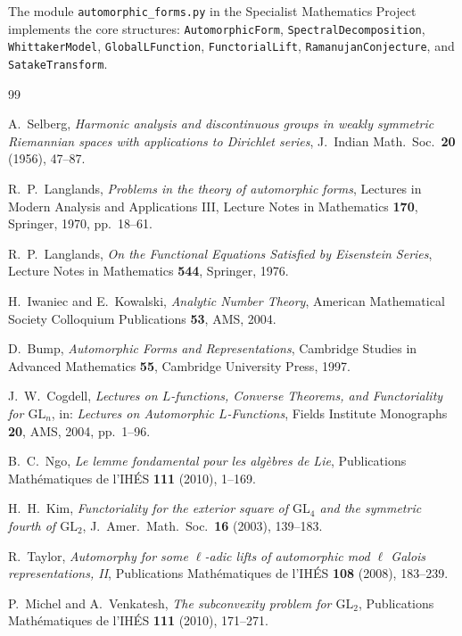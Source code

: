 \documentclass[12pt,a4paper]{amsart}
\theoremstyle{definition}
\newcommand{\GL}{\mathrm{GL}}
\begin{document}
The module \texttt{automorphic\_forms.py} in the Specialist Mathematics Project
implements the core structures: \texttt{AutomorphicForm}, \texttt{SpectralDecomposition},
\texttt{WhittakerModel}, \texttt{GlobalLFunction}, \texttt{FunctorialLift},
\texttt{RamanujanConjecture}, and \texttt{SatakeTransform}.

\begin{thebibliography}{99}

A.~Selberg,
\textit{Harmonic analysis and discontinuous groups in weakly symmetric Riemannian
spaces with applications to Dirichlet series},
J.~Indian Math.\ Soc.\ \textbf{20} (1956), 47--87.

R.~P.~Langlands,
\textit{Problems in the theory of automorphic forms},
Lectures in Modern Analysis and Applications III,
Lecture Notes in Mathematics \textbf{170}, Springer, 1970, pp.~18--61.

R.~P.~Langlands,
\textit{On the Functional Equations Satisfied by Eisenstein Series},
Lecture Notes in Mathematics \textbf{544}, Springer, 1976.

H.~Iwaniec and E.~Kowalski,
\textit{Analytic Number Theory},
American Mathematical Society Colloquium Publications \textbf{53}, AMS, 2004.

D.~Bump,
\textit{Automorphic Forms and Representations},
Cambridge Studies in Advanced Mathematics \textbf{55}, Cambridge University Press, 1997.

J.~W.~Cogdell,
\textit{Lectures on $L$-functions, Converse Theorems, and Functoriality for $\GL_n$},
in: \textit{Lectures on Automorphic $L$-Functions},
Fields Institute Monographs \textbf{20}, AMS, 2004, pp.~1--96.

B.~C.~Ngo,
\textit{Le lemme fondamental pour les algèbres de Lie},
Publications Mathématiques de l'IHÉS \textbf{111} (2010), 1--169.

H.~H.~Kim,
\textit{Functoriality for the exterior square of $\GL_4$ and the symmetric fourth of $\GL_2$},
J.~Amer.\ Math.\ Soc.\ \textbf{16} (2003), 139--183.

R.~Taylor,
\textit{Automorphy for some $\ell$-adic lifts of automorphic mod $\ell$ Galois representations, II},
Publications Mathématiques de l'IHÉS \textbf{108} (2008), 183--239.

P.~Michel and A.~Venkatesh,
\textit{The subconvexity problem for $\GL_2$},
Publications Mathématiques de l'IHÉS \textbf{111} (2010), 171--271.

\end{thebibliography}
\end{document}
